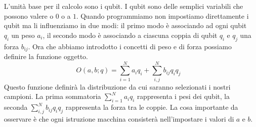 L'unità base per il calcolo sono i qubit. I qubit sono delle semplici variabili che possono valere o $0$ o a $1$. Quando programmiamo non impostiamo direttamente i qubit ma li influenziamo in due modi: il primo modo è associando ad ogni qubit $q_i$ un peso $a_i$, il secondo modo è associando a ciascuna coppia di qubit $q_i$ e $q_j$ una forza $b_{ij}$. Ora che abbiamo introdotto i concetti di peso e di forza possiamo definire la funzione oggetto.
$$O(a, b; q) = \sum_{i=1}^N a_i q_i + \sum_{i,j}^N b_{ij} q_i q_j$$
Questo funzione definirà la distribuzione da cui saranno selezionati i nostri campioni. La prima sommatoria $\sum_{i=1}^N a_i q_i$ rappresenta i pesi dei qubit, la seconda $\sum_{i,j}^N b_{ij} q_i q_j$ rappresenta la forza tra le coppie. La cosa importante da osservare è che ogni istruzione macchina consisterà nell'impostare i valori di $a$ e $b$.

